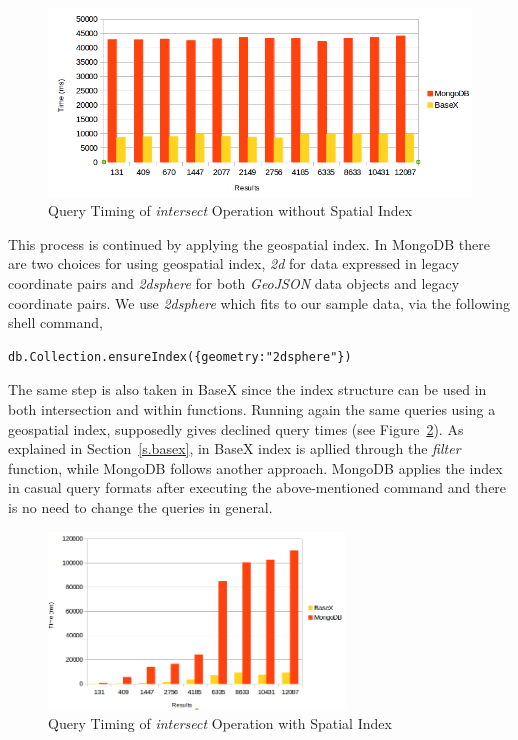 \documentclass[a4paper,12pt]{article}
\begin{document}
\begin{figure}
\centering
\includegraphics[width=\textwidth,height=0.25\textheight]{BXvsMongo-NoIndex-Intersects}
\caption{Query Timing of \textit{intersect} Operation without Spatial Index}
\label{figBXvsMongoNoIndexIntersects}
\end{figure}

This process is continued by applying the geospatial index. In MongoDB there are two choices for using geospatial index, \textit{2d} for data expressed in legacy coordinate pairs and \textit{2dsphere} for both \textit{GeoJSON} data objects and legacy coordinate pairs. We use \textit{2dsphere} which fits to our sample data, via the following shell command,

\begin{verbatim}
db.Collection.ensureIndex({geometry:"2dsphere"})  
\end{verbatim}

The same step is also taken in BaseX since the index structure can be used in both intersection and within functions. Running again the same queries using a geospatial index, supposedly gives declined query times (see Figure~\ref{figBXvsMongoIndexIntersects}). As explained in Section~\ref{s.basex}, in BaseX index is apllied through the \textit{filter} function, while MongoDB follows another approach. MongoDB applies the index in casual query formats after executing the above-mentioned command and there is no need to change the queries in general. 


\begin{figure}
\centering
\includegraphics[width=0.7\textwidth]{BXvsMongo-Intersects-Index}
\caption{Query Timing of \textit{intersect} Operation with Spatial Index}
\label{figBXvsMongoIndexIntersects}
\end{figure}
\end{document}
